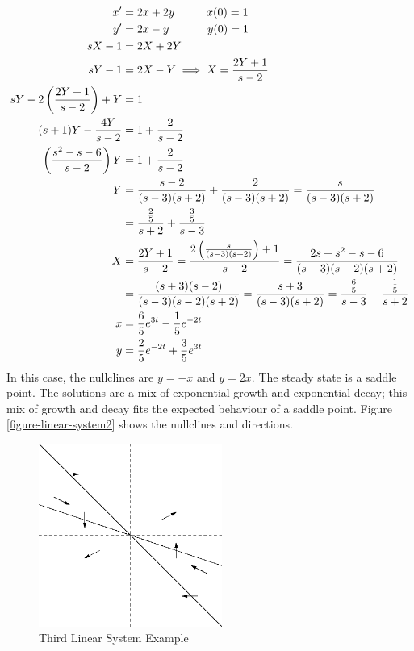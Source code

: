 \documentclass[fleqn,letterpaper]{report}
\begin{document}
\begin{example}
\begin{align*}
x^\prime & = 2x + 2y \hspace{1cm} x(0) = 1 \\
y^\prime & = 2x - y \hspace{1.2cm} y(0) = 1 \\
sX - 1 & = 2X + 2Y \\
sY - 1 & = 2X - Y \implies X = \frac{2Y+1}{s-2} \\
sY - 2 \left( \frac{2Y+1}{s-2} \right) + Y & = 1 \\
(s+1) Y - \frac{4Y}{s-2} & = 1 + \frac{2}{s-2} \\
\left( \frac{s^2-s-6}{s-2} \right) Y & = 1 + \frac{2}{s-2} \\
Y & = \frac{s-2}{(s-3)(s+2)} + \frac{2}{(s-3)(s+2)} =
\frac{s}{(s-3)(s+2)} \\
& = \frac{\frac{2}{5}}{s+2} + \frac{\frac{3}{5}}{s-3} \\
X & = \frac{2Y+1}{s-2} = \frac{2\left( \frac{s}{(s-3)(s+2)}
\right) + 1}{s-2} = \frac{2s + s^2 - s - 6}{(s-3)(s-2)(s+2)} \\
& = \frac{(s+3)(s-2)}{(s-3)(s-2)(s+2)} 
= \frac{s+3}{(s-3)(s+2)} = \frac{\frac{6}{5}}{s-3} -
\frac{\frac{1}{5}}{s+2} \\
x & = \frac{6}{5} e^{3t} - \frac{1}{5} e^{-2t} \\
y & = \frac{2}{5} e^{-2t} + \frac{3}{5} e^{3t} 
\end{align*}
In this case, the nullclines are $y = -x$ and $y = 2x$. 
The steady state is a saddle point. The solutions are 
a mix of exponential growth and exponential decay; this mix of
growth and decay fits the expected behaviour of a saddle point.
Figure \ref{figure-linear-system2} shows the nullclines
and directions. 
\end{example}

\begin{figure}[t]
\centering
\includegraphics[width=6cm]{figure36.eps}
\caption{Third Linear System Example}
\label{figure-linear-system3}
\end{figure}
\end{document}
